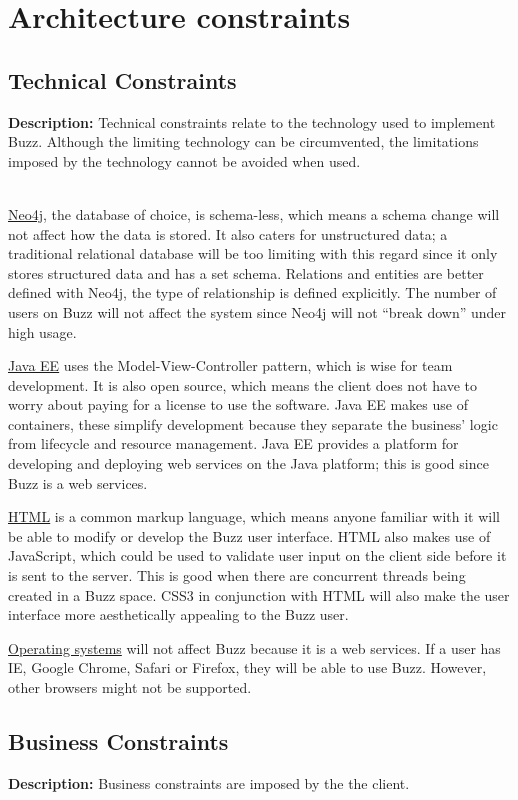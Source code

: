 \documentclass{article}
\begin{document}
\section{Architecture constraints}
\subsection{Technical Constraints}
\textbf{Description:}
Technical constraints relate to the technology used to implement Buzz. Although the limiting technology can be circumvented, the limitations imposed by the technology cannot be avoided when used. \\ \\ \par
\underline{Neo4j}, the database of choice, is schema-less, which means a schema change will not affect how the data is stored. It also caters for unstructured data; a traditional relational database will be too limiting with this regard since it only stores structured data and has a set schema. Relations and entities are better defined with Neo4j, the type of relationship is defined explicitly. The number of users on Buzz will not affect the system since Neo4j will not “break down” under high usage. \par
\underline{Java EE} uses the Model-View-Controller pattern, which is wise for team development. It is also open source, which means the client does not have to worry about paying for a license to use the software. Java EE makes use of containers, these simplify development because they separate the business’  logic from lifecycle and resource management. Java EE provides a platform for developing and deploying web services on the Java platform; this is good since Buzz is a web services. \par
\underline{HTML} is a common markup language, which means anyone familiar with it will be able to modify or develop the Buzz user interface. HTML also makes use of JavaScript, which could be used to validate user input on the client side before it is sent to the server. This is good when there are concurrent threads being created in  a Buzz space. CSS3 in conjunction with HTML will also make the user interface more aesthetically appealing to the Buzz user.\par 
\underline{Operating systems} will not affect Buzz because it is a web services. If a user has IE, Google Chrome, Safari or Firefox, they will be able to use Buzz. However, other browsers might not be supported. 
\subsection{Business Constraints}
\textbf{Description:}
Business constraints are imposed by the the client.
\end{document}
